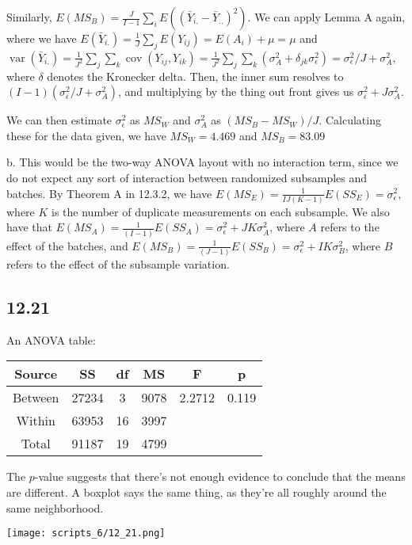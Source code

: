 \documentclass{article}
\newcommand{\ep}{\epsilon}
\DeclareMathOperator{\cov}{cov}
\DeclareMathOperator{\var}{var}
\begin{document}
Similarly, $E(MS_B)=\frac{J}{I-1}\sum_iE((\bar{Y}_{i.}-\bar{Y}_{..})^2)$. We can apply Lemma A again, where we have $E(\bar{Y}_{i.})=\frac{1}{J}\sum_jE(Y_{ij})=E(A_i)+\mu=\mu$ and $\var(\bar{Y}_{i.})=\frac{1}{J^2}\sum_j\sum_k\cov(Y_{ij},Y_{ik})=\frac{1}{J^2}\sum_j\sum_k(\sigma_A^2+\delta_{jk}\sigma_\ep^2)=\sigma_\ep^2/J+\sigma_A^2$, where $\delta$ denotes the Kronecker delta. Then, the inner sum resolves to $(I-1)(\sigma_\ep^2/J+\sigma_A^2)$, and multiplying by the thing out front gives us $\sigma_\ep^2+J\sigma_A^2$.

We can then estimate $\sigma_\ep^2$ as $MS_W$ and $\sigma_A^2$ as $(MS_B-MS_W)/J$. Calculating these for the data given, we have $MS_W=4.469$ and $MS_B=83.09$

\noindent b. This would be the two-way ANOVA layout with no interaction term, since we do not expect any sort of interaction between randomized subsamples and batches. By Theorem A in 12.3.2, we have $E(MS_E)=\frac{1}{IJ(K-1)}E(SS_E)=\sigma_\ep^2$, where $K$ is the number of duplicate measurements on each subsample. We also have that $E(MS_A)=\frac{1}{(I-1)}E(SS_A)=\sigma_\ep^2+JK\sigma_A^2$, where $A$ refers to the effect of the batches, and $E(MS_B)=\frac{1}{(J-1)}E(SS_B)=\sigma_\ep^2+IK\sigma_B^2$, where $B$ refers to the effect of the subsample variation.
\subsection*{12.21}
An ANOVA table:

\begin{tabular}{cccccc}
\hline
Source & SS & df & MS & F & p\\
\hline
Between & 27234 & 3 & 9078 & 2.2712 & 0.119\\
Within & 63953 & 16 & 3997 \\
Total & 91187 & 19 & 4799\\
\end{tabular}

The $p$-value suggests that there's not enough evidence to conclude that the means are different. A boxplot says the same thing, as they're all roughly around the same neighborhood.

\texttt{[image: scripts\_6/12\_21.png]}
\end{document}

